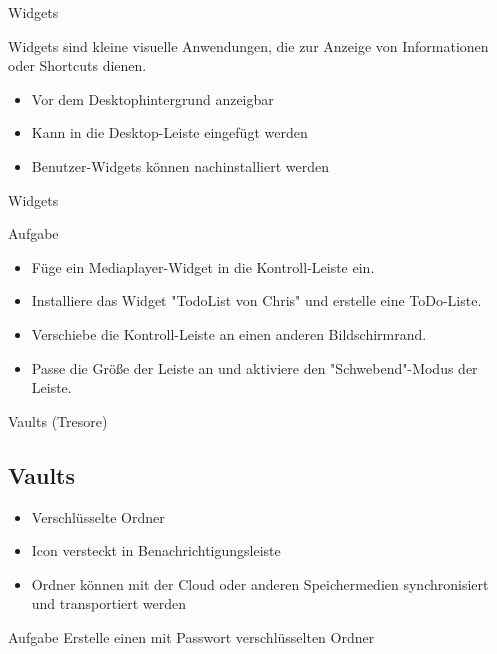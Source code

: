\begin{frame}{Widgets}

    \pause

    Widgets sind kleine visuelle Anwendungen, die zur Anzeige von Informationen oder Shortcuts
    dienen.

    \pause

    \begin{itemize}
        \item Vor dem Desktophintergrund anzeigbar\pause
        \item Kann in die Desktop-Leiste eingefügt werden\pause
        \item Benutzer-Widgets können nachinstalliert werden
    \end{itemize}
\end{frame}


\begin{frame}{Widgets}
    \begin{alertblock}{Aufgabe}
        \begin{itemize}
            \pause
            \item Füge ein Mediaplayer-Widget in die Kontroll-Leiste ein.\pause
            \item Installiere das Widget "TodoList von Chris" und erstelle eine ToDo-Liste.\pause
            \item Verschiebe die Kontroll-Leiste an einen anderen Bildschirmrand.\pause
            \item Passe die Größe der Leiste an und aktiviere den "Schwebend"-Modus der Leiste.
        \end{itemize}
    \end{alertblock}
\end{frame}

\begin{frame}{Vaults (Tresore)}
    \subsection{Vaults}\label{subsec:vaults}
    \pause
    \begin{itemize}
        \item Verschlüsselte Ordner\pause
        \item Icon versteckt in Benachrichtigungsleiste\pause
        \item Ordner können mit der Cloud oder anderen Speichermedien synchronisiert und
        transportiert werden
    \end{itemize}

    \pause
    \vspace{0.5cm}
    \begin{alertblock}{Aufgabe}
        Erstelle einen mit Passwort verschlüsselten Ordner
    \end{alertblock}
\end{frame}